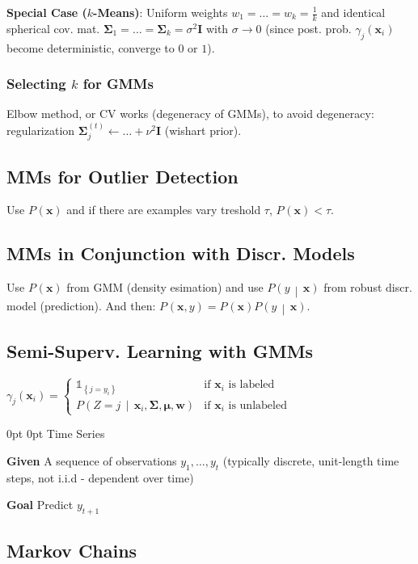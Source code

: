 \documentclass[a4paper,8pt,landscape]{extarticle}
\makeatletter
\newcommand{\set}[1]{\left\{ #1 \right\}}
\newcommand{\Prob}[2][]{P_{#1}\left( #2 \right)}
\newcommand{\cProb}[2]{P\left( #1 \,\middle|\, #2 \right)}
\newcommand{\ind}[1]{\mathds{1}_{\set{#1}}}
\newcommand{\mat}[1]{\mathbf{#1}}
\renewcommand{\vec}[1]{\mathbf{#1}}
\newcommand{\vw}{\vec{w}}
\newcommand{\vx}{\vec{x}}
\newcommand{\vmu}{\boldsymbol{\mu}}
\newcommand{\MI}{\mat{I}}
\newcommand{\MSigma}{\mat{\Sigma}}
\newcommand*{\mybox}[1]{%
    \noindent\colorbox{sectionbarcolor}{%
        \parbox{\dimexpr\columnwidth-2\fboxsep\relax}{%
            \textcolor{white}{#1}}}}
\newcommand*{\mybox}[1]{%
    \noindent\colorbox{sectioncolor}{%
        \parbox{\dimexpr\columnwidth-2\fboxsep\relax}{%
            \textcolor{white}{#1}}}}
\renewcommand\section{\@startsection {section}{1}{\z@}%
                                   {0pt}%
                                   {0pt}%
                                   {\normalfont\bfseries\mybox}}
\makeatother
\begin{document}
\begin{multicols*}{3}
\textbf{Special Case ($k$-Means)}: Uniform weights $w_1=\ldots=w_k=\frac{1}{k}$
and identical spherical cov. mat.
$\MSigma_1=\ldots=\MSigma_k=\sigma^2\MI$ with $\sigma\to 0$ (since post. prob.
$\gamma_j(\vx_i)$ become deterministic, converge to $0$ or $1$).

\subsubsection{Selecting $k$ for GMMs}

Elbow method, or CV works (degeneracy of GMMs), to avoid
degeneracy: regularization $\MSigma_j^{(t)}\leftarrow \ldots + \nu^2\MI$ (wishart
prior).

\subsection{MMs for Outlier Detection}

Use $\Prob{\vx}$ and if there are examples vary treshold $\tau$,
$\Prob{\vx}<\tau$.

\subsection{MMs in Conjunction with Discr. Models}

Use $\Prob{\vx}$ from GMM (density esimation) and use $\cProb{y}{\vx}$
from robust discr. model (prediction). And then:
$\Prob{\vx,y}=\Prob{\vx}\cProb{y}{\vx}$.


\subsection{Semi-Superv. Learning with GMMs}

$
\gamma_j(\vx_i)=\begin{cases}
\ind{j=y_i} & \text{if }\vx_i\text{ is labeled}\\
\cProb{Z=j}{\vx_i,\MSigma,\vmu,\vw} & \text{if }\vx_i\text{ is unlabeled}
\end{cases}
$

\section{Time Series}

\textbf{Given} A sequence of observations $y_1,\ldots,y_t$ (typically discrete,
unit-length time steps, not i.i.d - dependent over time)

\textbf{Goal} Predict $y_{t+1}$

\subsection{Markov Chains}


\end{multicols*}
\end{document}
